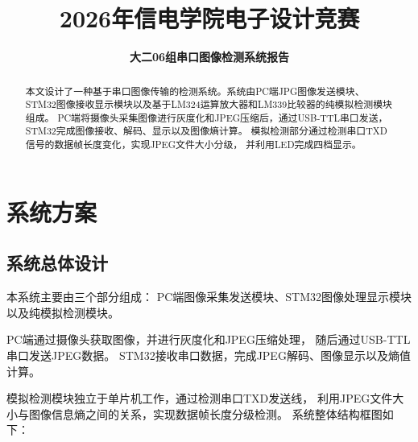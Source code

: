 \documentclass[a4paper]{article}
\title{\Huge\bfseries 2026年信电学院电子设计竞赛}
\date{\LARGE\bfseries 大二06组串口图像检测系统报告} %
\begin{document}
	\maketitle
	\vspace{10em} %
	\begin{abstract}
		本文设计了一种基于串口图像传输的检测系统。系统由PC端JPG图像发送模块、
STM32图像接收显示模块以及基于LM324运算放大器和LM339比较器的纯模拟检测模块组成。
PC端将摄像头采集图像进行灰度化和JPEG压缩后，通过USB-TTL串口发送，
STM32完成图像接收、解码、显示以及图像熵计算。
模拟检测部分通过检测串口TXD信号的数据帧长度变化，实现JPEG文件大小分级，
并利用LED完成四档显示。
\\
		\newline
	\end{abstract}
	
	\vspace{1cm}
	\vspace{1cm}
	\vspace{1cm}
	\vspace{1cm}
	\begin{table}[ht]
		\centering  
	\label{table:example}  %
\end{table}
	\newpage
	\tableofcontents %


	\newpage
\section{系统方案}

\subsection{系统总体设计}

本系统主要由三个部分组成：
PC端图像采集发送模块、STM32图像处理显示模块以及纯模拟检测模块。

PC端通过摄像头获取图像，并进行灰度化和JPEG压缩处理，
随后通过USB-TTL串口发送JPEG数据。
STM32接收串口数据，完成JPEG解码、图像显示以及熵值计算。

模拟检测模块独立于单片机工作，通过检测串口TXD发送线，
利用JPEG文件大小与图像信息熵之间的关系，实现数据帧长度分级检测。
系统整体结构框图如下：
\end{document}
